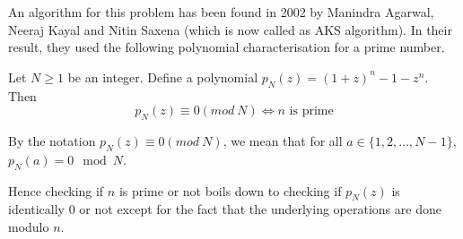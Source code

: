An algorithm for this problem has been found in 2002 by Manindra Agarwal,
Neeraj Kayal and Nitin Saxena (which is now called as AKS algorithm). 
In their result, they used the following
polynomial characterisation for a prime number.
\begin{theorem} Let $N \ge 1$ be
	an integer. Define a polynomial 
	$p_N(z) = (1+z)^n - 1 - z^n$. Then \[ p_N(z) \equiv 0 (mod~ N)
	\iff n \text{ is prime} \]
\end{theorem}
By the notation $p_N(z) \equiv 0 (mod~ N)$, we mean that for all $a \in
\{1,2,\ldots, N-1\}$, $p_N(a) = 0 \mod N$.

Hence checking if $n$ is prime or not boils down to checking if $p_N(z)$ is
identically $0$ or not except for the fact that the underlying operations are
done modulo $n$.

